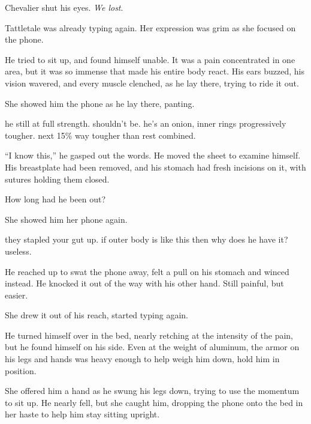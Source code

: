 Chevalier shut his eyes.  \emph{We lost}.



Tattletale was already typing again.  Her expression was grim as she focused on the phone.



He tried to sit up, and found himself unable.  It was a pain concentrated in one area, but it was so immense that made his entire body react.  His ears buzzed, his vision wavered, and every muscle clenched, as he lay there, trying to ride it out.



She showed him the phone as he lay there, panting.



he still at full strength.  shouldn't be.  he's an onion, inner rings progressively tougher.  next 15\% way tougher than rest combined.



``I know this,'' he gasped out the words.  He moved the sheet to examine himself.  His breastplate had been removed, and his stomach had fresh incisions on it, with sutures holding them closed.



How long had he been out?



She showed him her phone again.



they stapled your gut up.  if outer body is like this then why does he have it?  useless.



He reached up to swat the phone away, felt a pull on his stomach and winced instead.  He knocked it out of the way with his other hand.  Still painful, but easier.



She drew it out of his reach, started typing again.



He turned himself over in the bed, nearly retching at the intensity of the pain, but he found himself on his side.  Even at the weight of aluminum, the armor on his legs and hands was heavy enough to help weigh him down, hold him in position.



She offered him a hand as he swung his legs down, trying to use the momentum to sit up.  He nearly fell, but she caught him, dropping the phone onto the bed in her haste to help him stay sitting upright.



